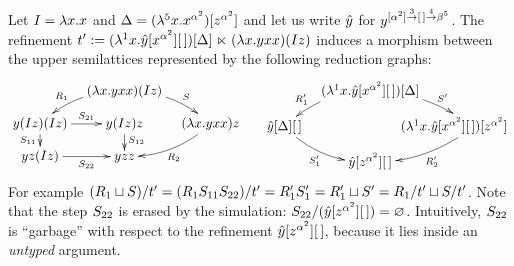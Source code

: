 \begin{example}
Let $I = \lambda x. x$
and $\Delta = (\lambda^{5} x. x^{\alpha^2})[z^{\alpha^2}]$
and let us write $\hat{y}$ for $y^{[\alpha^2] \overset{3}{\to} [\,] \overset{4}{\to} \beta^5}$.
The refinement $t' := (\lambda^{1} x. \hat{y}[x^{\alpha^2}][\,])[\Delta] \mathrel{\ltimes} (\lambda x. yxx)(Iz)$
induces a morphism between the upper semilattices represented by the following reduction graphs:
\[
  \xymatrix@R=.3cm@C=.3cm{
  &
    (\lam{\var}{\vartwo\var\var})(I\varthree)
    \ar@/_.25cm/[dl]_-{\redex_1}
    \ar@/^.25cm/[dr]^-{\redextwo}
  &
  &
  \\
    \vartwo(I z)(I z)
    \ar[d]_-{\redextwo_{11}}
    \ar[r]^-{\redextwo_{21}}
  &
    \vartwo(I\varthree)\varthree
    \ar[d]^{\redextwo_{12}}
  &
    (\lam{\var}{\vartwo\var\var})\varthree
    \ar@/^.25cm/[dl]^-{\redex_2}
  \\
    \vartwo \varthree (I\varthree)
    \ar[r]_-{\redextwo_{22}}
  &
    \vartwo \varthree \varthree
  }
  \xymatrix@R=.3cm@C=.3cm{
  &
    (\lamp{1}{\var}{\hat{\vartwo}[\var^{\alpha^2}][\,]})[\Delta]
    \ar@/_.25cm/[dl]_-{\redex'_1}
    \ar@/^.25cm/[dr]^-{\redextwo'}
  \\
    \hat{\vartwo}[\Delta][\,]
    \ar@/_.25cm/[dr]_-{\redextwo'_1}
  &
  &
    \hspace{-1cm}(\lamp{1}{\var}{\hat{\vartwo}[\var^{\alpha^2}][\,]})[\varthree^{\alpha^2}]
    \ar@/^.25cm/[dl]^-{\redex'_2}
  \\
  &
    \hat{\vartwo}[\varthree^{\alpha^2}][\,]
  }
\]
For example
$(R_1 \sqcup S)/t' = (R_1S_{11}S_{22})/t' = R'_1S'_1 = R'_1 \sqcup S' = R_1/t' \sqcup S/t'$.
Note that the step $S_{22}$ is erased by the simulation: $S_{22}/(\hat{y}[z^{\alpha^2}][\,]) = \varnothing$.
Intuitively, $S_{22}$ is ``garbage'' with respect to the refinement $\hat{y}[z^{\alpha^2}][\,]$,
because it lies inside an {\em untyped} argument.
\end{example}

